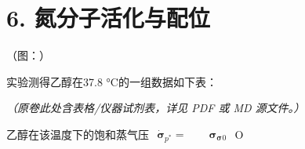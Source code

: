 \section*{6. 氮分子活化与配位}
（图：）

实验测得⼄醇在37.8 °C的⼀组数据如下表：

\textit{（原卷此处含表格/仪器试剂表，详见 PDF 或 MD 源文件。）}

⼄醇在该温度下的饱和蒸⽓压 $\begin{array} { r } { \dot { \mathbf { \sigma } } _ { p ^ { * } } = \qquad \mathbf { \sigma } _ { \mathbf { \sigma } _ { } 0 } } \end{array}$ O
